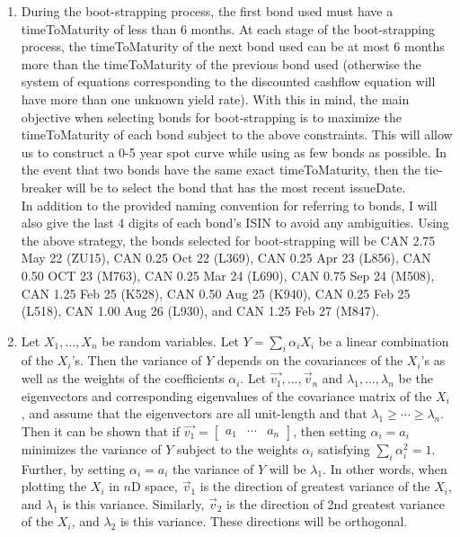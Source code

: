 \documentclass{article}
\begin{document}
\begin{enumerate}
\begin{enumerate}
		\end{enumerate}
		\item During the boot-strapping process, the first bond used must have a timeToMaturity of less than 6 months. At each stage of the boot-strapping process, the timeToMaturity of the next bond used can be at most 6 months more than the timeToMaturity of the previous bond used (otherwise the system of equations corresponding to the discounted cashflow equation will have more than one unknown yield rate). With this in mind, the main objective when selecting bonds for boot-strapping is to maximize the timeToMaturity of each bond subject to the above constraints. This will allow us to construct a 0-5 year spot curve while using as few bonds as possible. In the event that two bonds have the same exact timeToMaturity, then the tie-breaker will be to select the bond that has the most recent issueDate.\\
		In addition to the provided naming convention for referring to bonds, I will also give the last 4 digits of each bond's ISIN to avoid any ambiguities.  Using the above strategy, the bonds selected for boot-strapping will be CAN 2.75 May 22 (ZU15), CAN 0.25 Oct 22 (L369), CAN 0.25 Apr 23 (L856), CAN 0.50 OCT 23 (M763), CAN 0.25 Mar 24 (L690), CAN 0.75 Sep 24 (M508), CAN 1.25 Feb 25 (K528), CAN 0.50 Aug 25 (K940), CAN 0.25 Feb 25 (L518), CAN 1.00 Aug 26 (L930), and CAN 1.25 Feb 27 (M847).
		
		
		
		\item Let $X_1, \dots, X_n$ be random variables. Let $Y = \sum_i \alpha_i X_i$ be a linear combination of the $X_i$'s. Then the variance of $Y$ depends on the covariances of the $X_i$'s as well as the weights of the coefficients $\alpha_i$. Let $\vec{v_1}, \dots, \vec{v}_n$ and $\lambda_1, \dots, \lambda_n$ be the eigenvectors and corresponding eigenvalues of the covariance matrix of the $X_i$, and assume that the eigenvectors are all unit-length and that $\lambda_1 \geq \cdots \geq \lambda_n$. Then it can be shown that if $\vec{v_1} = \begin{bmatrix}
			a_1 & \cdots & a_n
		\end{bmatrix}$, then setting $\alpha_i = a_i$ minimizes the variance of $Y$ subject to the weights $\alpha_i$ satisfying $\sum_i \alpha_i^2 = 1$. Further, by setting $\alpha_i=a_i$ the variance of $Y$ will be $\lambda_1$. In other words, when plotting the $X_i$ in $n$D space, $\vec{v}_1$ is  the direction of greatest variance of the $X_i$, and $\lambda_1$ is this variance. Similarly, $\vec{v}_2$ is the direction of 2nd greatest variance of the $X_i$, and $\lambda_2$ is this variance. These directions will be orthogonal. 
	

\end{enumerate}
\end{document}
